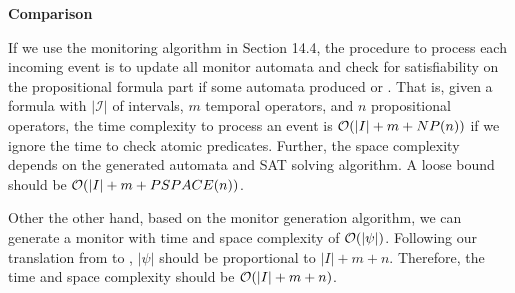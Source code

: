 \documentclass{article}
\begin{document}
\begin{enumerate}
\textbf{Comparison}

If we use the \ALTL monitoring algorithm in Section 14.4,
the procedure to process each incoming event is to update all monitor automata
and check for satisfiability on the propositional formula part if some automata
produced \TT or \FF.
That is, given a \ALTL formula with $|\mathcal{I}|$ of intervals, $m$ \ALTL
temporal operators, and $n$ propositional operators,
the time complexity to process an event is $\mathcal{O}(|I| + m + NP(n))$ if we ignore
the time to check atomic predicates.
Further, the space complexity depends on the generated automata and SAT solving
algorithm.
A loose bound should be $\mathcal{O}(|I| + m + PSPACE(n))$.

Other the other hand, based on the \ptLTL monitor generation algorithm,
we can generate a monitor with time and space complexity of $\mathcal{O}(|\psi|)$.
Following our translation from \ALTL to \ptLTL,
$|\psi|$ should be proportional to $|I| + m + n$.
Therefore, the time and space complexity should be $\mathcal{O}(|I| + m + n)$. 

\end{enumerate}
\end{document}
